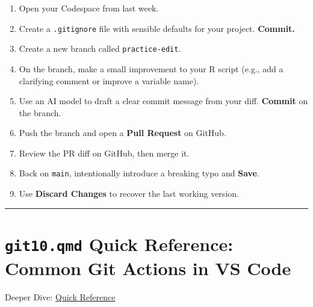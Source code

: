 \documentclass[
  letterpaper,
  DIV=11,
  numbers=noendperiod,
  oneside]{scrreprt}
\providecommand{\tightlist}{%
  \setlength{\itemsep}{0pt}\setlength{\parskip}{0pt}}
\begin{document}
\begin{enumerate}
\def\labelenumi{\arabic{enumi}.}
\tightlist
\item
  Open your Codespace from last week.
\item
  Create a \texttt{.gitignore} file with sensible defaults for your
  project. \textbf{Commit.}
\item
  Create a new branch called \texttt{practice-edit}.
\item
  On the branch, make a small improvement to your R script (e.g., add a
  clarifying comment or improve a variable name).
\item
  Use an AI model to draft a clear commit message from your diff.
  \textbf{Commit} on the branch.
\item
  Push the branch and open a \textbf{Pull Request} on GitHub.
\item
  Review the PR diff on GitHub, then merge it.
\item
  Back on \texttt{main}, intentionally introduce a breaking typo and
  \textbf{Save}.
\item
  Use \textbf{Discard Changes} to recover the last working version.
\end{enumerate}

\begin{center}\rule{0.5\linewidth}{0.5pt}\end{center}

\section*{\texorpdfstring{\texttt{git10.qmd} Quick Reference: Common Git
Actions in VS
Code}{git10.qmd Quick Reference: Common Git Actions in VS Code}}\label{git10.qmd-quick-reference-common-git-actions-in-vs-code}


Deeper Dive: \href{git10-quick-reference.qmd}{Quick Reference}
\end{document}
